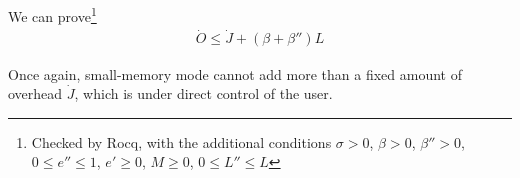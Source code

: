 \documentclass{article}
\begin{document}
We can prove\footnote{
Checked by Rocq, with the additional conditions
$\sigma > 0$,
$\beta > 0$,
$\beta'' > 0$,
$ 0 \le e'' \le 1$,
$e' \ge 0$,
$M \ge 0$,
$0 \le L'' \le L$
}
\begin{gather}
\dot{O} \leq \dot{J} + (\beta + \beta'')L
\end{gather}

Once again, small-memory mode cannot add more than a
fixed amount of overhead $\dot{J}$, which is under direct control of
the user.
\end{document}
